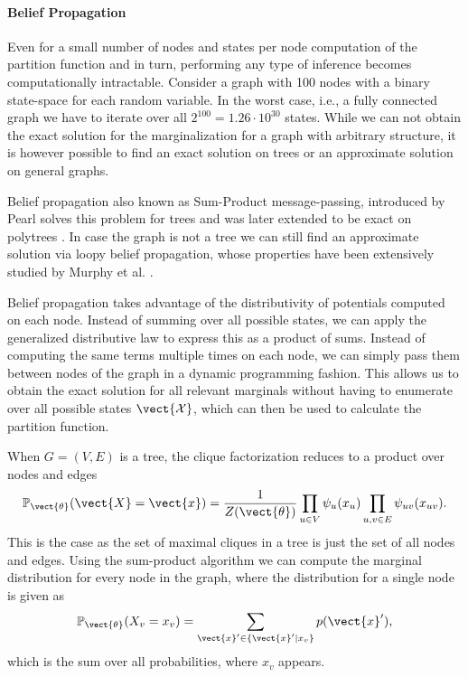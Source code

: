 \paragraph*{Belief Propagation}
Even for a small number of nodes and states per node computation of the partition function and in turn, performing any type of inference becomes computationally intractable.
Consider a graph with 100 nodes with a binary state-space for each random variable.
In the worst case, i.e., a fully connected graph we have to iterate over all $2^{100} = 1.26\cdot 10^{30}$ states.
While we can not obtain the exact solution for the marginalization for a graph with arbitrary structure, it is however possible to find an exact solution on trees or an approximate solution on general graphs.


Belief propagation also known as Sum-Product message-passing, introduced by Pearl \cite{pearl1982reverend} solves this problem for trees and was later extended to be exact on polytrees \cite{kim1983computational}.
In case the graph is not a tree we can still find an approximate solution via loopy belief propagation, whose properties have been extensively studied by Murphy et al. \cite{murphy2013loopy}.

Belief propagation takes advantage of the distributivity of potentials computed on each node.
Instead of summing over all possible states, we can apply the generalized distributive law to express this as a product of sums.
Instead of computing the same terms multiple times on each node, we can simply pass them between nodes of the graph in a dynamic programming fashion.
This allows us to obtain the exact solution for all relevant marginals without having to enumerate over all possible states $\vect{\mathcal{X}}$, which can then be used to calculate the partition function.

When $G=(V,E)$ is a tree, the clique factorization reduces to a product over nodes and edges
\begin{equation}
    \label{eq:edgepot}
    \mathbb{P}_{\vect{\theta}}(\vect{X} = \vect{x}) = \frac{1}{Z(\vect{\theta})} \prod_{u\in V} \psi_u(x_u) \prod_{u,v \in E} \psi_{uv}(x_{uv}).
\end{equation}
This is the case as the set of maximal cliques in a tree is just the set of all nodes and edges.
Using the sum-product algorithm we can compute the marginal distribution for every node in the graph, where the distribution for a single node is given as
\begin{equation}
    \mathbb{P}_{\vect{\theta}}(X_v = x_v) = \sum_{\vect{x}' \in \{\vect{x}' \lvert x_v\}} p(\vect{x}'),
\end{equation}
which is the sum over all probabilities, where $x_v$ appears.

